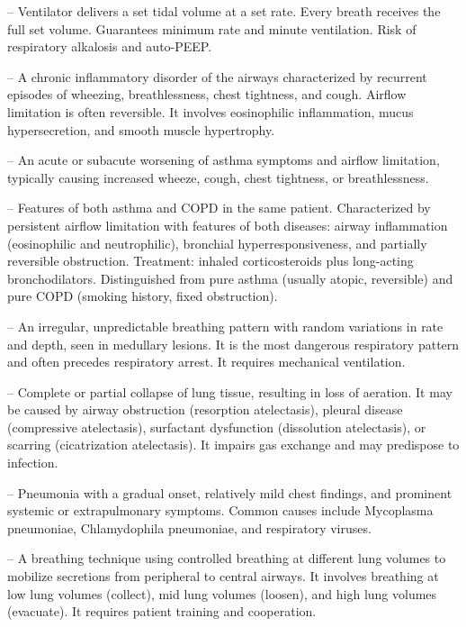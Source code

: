 -- Ventilator delivers a set tidal volume at a set rate. Every breath receives the full set volume. Guarantees minimum rate and minute ventilation. Risk of respiratory alkalosis and auto-PEEP.

-- A chronic inflammatory disorder of the airways characterized by recurrent episodes of wheezing, breathlessness, chest tightness, and cough. Airflow limitation is often reversible. It involves eosinophilic inflammation, mucus hypersecretion, and smooth muscle hypertrophy.

-- An acute or subacute worsening of asthma symptoms and airflow limitation, typically causing increased wheeze, cough, chest tightness, or breathlessness.

-- Features of both asthma and COPD in the same patient. Characterized by persistent airflow limitation with features of both diseases: airway inflammation (eosinophilic and neutrophilic), bronchial hyperresponsiveness, and partially reversible obstruction. Treatment: inhaled corticosteroids plus long-acting bronchodilators. Distinguished from pure asthma (usually atopic, reversible) and pure COPD (smoking history, fixed obstruction).

-- An irregular, unpredictable breathing pattern with random variations in rate and depth, seen in medullary lesions. It is the most dangerous respiratory pattern and often precedes respiratory arrest. It requires mechanical ventilation.

-- Complete or partial collapse of lung tissue, resulting in loss of aeration. It may be caused by airway obstruction (resorption atelectasis), pleural disease (compressive atelectasis), surfactant dysfunction (dissolution atelectasis), or scarring (cicatrization atelectasis). It impairs gas exchange and may predispose to infection.

-- Pneumonia with a gradual onset, relatively mild chest findings, and prominent systemic or extrapulmonary symptoms. Common causes include Mycoplasma pneumoniae, Chlamydophila pneumoniae, and respiratory viruses.

-- A breathing technique using controlled breathing at different lung volumes to mobilize secretions from peripheral to central airways. It involves breathing at low lung volumes (collect), mid lung volumes (loosen), and high lung volumes (evacuate). It requires patient training and cooperation.

